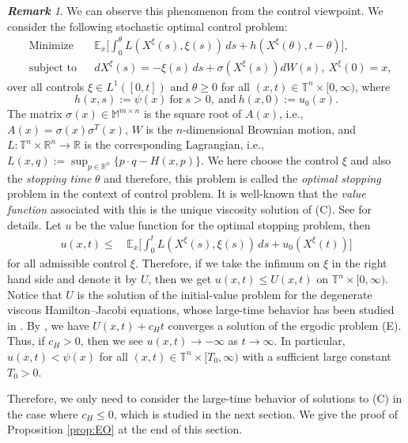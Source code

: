 \documentclass[12pt,reqno]{amsart}
\theoremstyle{plain}
\theoremstyle{remark}
\newtheorem{rem}{\bf{Remark}}
\numberwithin{equation}{section}
\begin{document}
\begin{rem}
We can observe this phenomenon from the control viewpoint. 
We consider the following stochastic optimal control problem: 
\begin{align}
&\text{Minimize}&  &
{\mathbb{E}}_{x}\Big[\int_{0}^{\theta}
L(X^{\xi}(s),\xi(s))\,ds
+h(X^{\xi}(\theta),t-\theta)
\Big], 
\nonumber\\
&\text{subject to} & &
dX^{\xi}(s)=-\xi(s)\,ds+{\sigma}(X^{\xi}(s))dW(s), \
X^{\xi}(0)=x,  \nonumber
\end{align}
over all controls $\xi\in L^{1}([0,t])$ and $\theta\ge0$ 
for all $(x,t)\in{\mathbb{T}^{n}\times[0,\infty)}$, where 
\[h(x,s):=\psi(x) \ \text{for} \ s>0, \ \text{and} \ 
h(x,0):=u_{0}(x).  
\]
The matrix  ${\sigma}(x)\in{\mathbb{M}}^{m\times n}$ is the square root of $A(x)$, i.e., $A(x)={\sigma}(x){\sigma}^{T}(x)$, 
$W$ is the $n$-dimensional Brownian motion, 
and $L:{\mathbb{T}}^n\times{\mathbb{R}}^n\to{\mathbb{R}}$ is the corresponding Lagrangian, i.e., $L(x,q):=\sup_{p\in{\mathbb{R}}^n}\{p\cdot q-H(x,p)\}$.  
We here choose the control $\xi$ and also the \textit{stopping time} $\theta$ 
and therefore, this problem is called the \textit{optimal stopping} problem 
in the context of control problem. 
It is well-known that the \textit{value function} associated with this is the unique viscosity solution of (C). See \cite{B,BCD} for details. 
Let $u$ be the value function for the optimal stopping problem,  then  
\begin{align*}
u(x,t)\le&\, 
{\mathbb{E}}_{x}\Big[\int_{0}^{t}
L(X^{\xi}(s),\xi(s))\,ds
+u_0(X^{\xi}(t))
\Big] 
\end{align*}
for all admissible control $\xi$. 
Therefore, if we take the infimum on $\xi$ in the right hand side and denote it by $U$, then 
we get $u(x,t)\le U(x,t)$ on ${\mathbb{T}^{n}\times[0,\infty)}$.
Notice that $U$ is the solution of the initial-value  
problem for the degenerate viscous Hamilton--Jacobi equations, whose
large-time behavior has been studied in \cite{CGMT}. 
By \cite[Theorem 1.1]{CGMT}, we have $U(x,t)+c_Ht$ converges a solution of 
the ergodic problem (E). 
Thus, if $c_H>0$, then we see $u(x,t)\to-\infty$ as $t\to \infty$. 
In particular, $u(x,t)<\psi(x)$ for all $(x,t)\in{\mathbb{T}}^n\times[T_0,\infty)$ with a sufficient large constant
$T_0>0$.  
\end{rem}

Therefore, we only need to consider the large-time behavior of solutions to (C) in the case where $c_H\le0$, which is studied in the next section.  
We give the proof of Proposition \ref{prop:EO} at the end of this section. 
\end{document}
